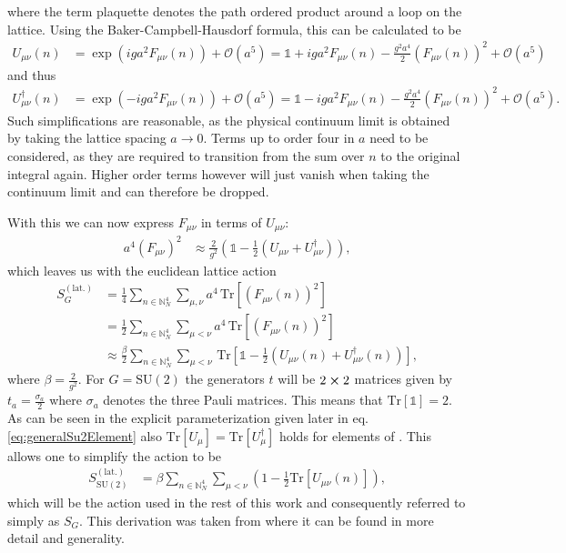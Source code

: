 where the term plaquette denotes the path ordered product around a loop on the lattice. Using the Baker-Campbell-Hausdorf formula, this can be calculated to be
\begin{align*}
 U_{\mu \nu}(n) & = \exp \left( iga^2 F_{\mu \nu} (n) \right) + \mathcal{O}(a^5) = \mathbb{1} + i g a^2 F_{\mu \nu} (n) - \frac{g^2 a^4}{2} (F_{\mu \nu} (n))^2 + \mathcal{O}(a^5)
\end{align*}
and thus
\begin{align*}
 U_{\mu \nu}^\dagger(n) & = \exp \left( - iga^2 F_{\mu \nu} (n) \right) + \mathcal{O}(a^5) = \mathbb{1} - i g a^2 F_{\mu \nu} (n) - \frac{g^2 a^4}{2} (F_{\mu \nu} (n) )^2 + \mathcal{O}(a^5) \textrm{.}
\end{align*}
Such simplifications are reasonable, as the physical continuum limit is obtained by taking the lattice spacing $a \rightarrow 0$. Terms up to order four in $a$ need to be considered, as they are required to transition from the sum over $n$ to the original integral again. Higher order terms however will just vanish when taking the continuum limit and can therefore be dropped.

With this we can now express $F_{\mu \nu}$ in terms of $U_{\mu \nu}$:
\begin{align*}
 a^4 (F_{\mu \nu})^2 & \approx \frac{2}{g^2} \left( \mathbb{1} - \frac{1}{2}\left( U_{\mu \nu} + U_{\mu \nu}^\dagger \right) \right) \textrm{,}
\end{align*}
which leaves us with the euclidean lattice action
\begin{align*}
 S^{(\textrm{lat.})}_G & = \frac{1}{4} \sum_{n \in \mathbb{N}^4_N} \sum_{\mu,\nu} a^4 \, \mathrm{Tr} \left[ \left( F_{\mu \nu} (n) \right)^2  \right]                                                        \\
                       & = \frac{1}{2} \sum_{n \in \mathbb{N}^4_N} \sum_{\mu < \nu}  a^4 \, \mathrm{Tr} \left[ \left( F_{\mu \nu} (n) \right)^2  \right]                                                     \\
                       & \approx \frac{\beta}{2} \sum_{n \in \mathbb{N}^4_N} \sum_{\mu < \nu} \, \mathrm{Tr} \left[ \mathbb{1} - \frac{1}{2}\left( U_{\mu \nu} (n) + U_{\mu \nu}^\dagger (n) \right) \right] \textrm{,}
\end{align*}
where $\beta = \frac{2}{g^2}$. For $G=\mathrm{SU}(2)$ the generators $t$ will be $2 \cross 2$ matrices given by $t_a = \frac{\sigma_a}{2}$ where $\sigma_a$ denotes the three Pauli matrices. This means that $\mathrm{Tr}\left[ \mathbb{1} \right] = 2$. As can be seen in the explicit parameterization given later in eq.  \ref{eq:generalSu2Element} also $ \mathrm{Tr} \left[ U_\mu \right] = \mathrm{Tr} \left[ U_\mu^\dagger \right] $ holds for elements of \SUTwo. This allows one to simplify the action to be
\begin{align*}
 S^{(\textrm{lat.})}_{\mathrm{SU}(2)} & = \beta \sum_{n \in \mathbb{N}^4_N} \sum_{\mu < \nu} \left( 1 - \frac{1}{2} \mathrm{Tr} \left[ U_{\mu \nu} (n) \right] \right) \textrm{,}
\end{align*}
which will be the action used in the rest of this work and consequently referred to simply as $S_G$. This derivation was taken from \cite{rothe:2005} where it can be found in more detail and generality.
